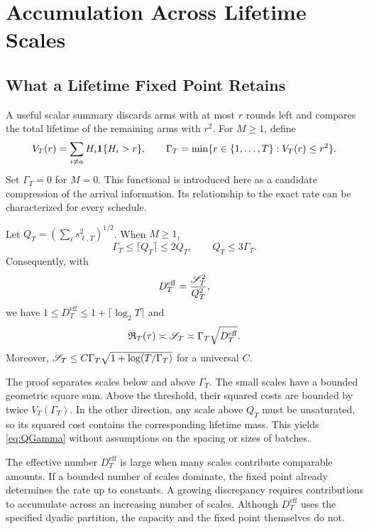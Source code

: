 \section{Accumulation Across Lifetime Scales}\label{sec:scales}
\subsection{What a Lifetime Fixed Point Retains}
A useful scalar summary discards arms with at most $r$ rounds left and compares the total lifetime of the remaining arms with $r^2$. For $M\ge1$, define
\begin{equation}\label{eq:fixed-point}
 V_T(r)=\sum_{i\ne a}H_i\mathbf 1\{H_i>r\},\qquad
 \Gamma_T=\min\{r\in\{1,\ldots,T\}:V_T(r)\le r^2\}.
\end{equation}
Set $\Gamma_T=0$ for $M=0$. This functional is introduced here as a candidate compression of the arrival information. Its relationship to the exact rate can be characterized for every schedule.

\begin{theorem}\label{thm:fixed-point}
Let $Q_T=(\sum_\ell s_{\ell,T}^2)^{1/2}$. When $M\ge1$,
\begin{equation}\label{eq:QGamma}
 \Gamma_T\le\lceil Q_T\rceil\le2Q_T,
 \qquad Q_T\le3\Gamma_T.
\end{equation}
Consequently, with
\begin{equation}\label{eq:effective}
 D_T^{\mathrm{eff}}=\frac{\mathscr S_T^2}{Q_T^2},
\end{equation}
we have $1\le D_T^{\mathrm{eff}}\le1+\lceil\log_2T\rceil$ and
\[
 \mathfrak R_T(\tau)\asymp\mathscr S_T\asymp\Gamma_T\sqrt{D_T^{\mathrm{eff}}}.
\]
Moreover, $\mathscr S_T\le C\Gamma_T\sqrt{1+\log(T/\Gamma_T)}$ for a universal $C$.
\end{theorem}

The proof separates scales below and above $\Gamma_T$. The small scales have a bounded geometric square sum. Above the threshold, their squared costs are bounded by twice $V_T(\Gamma_T)$. In the other direction, any scale above $Q_T$ must be unsaturated, so its squared cost contains the corresponding lifetime mass. This yields \eqref{eq:QGamma} without assumptions on the spacing or sizes of batches.

The effective number $D_T^{\mathrm{eff}}$ is large when many scales contribute comparable amounts. If a bounded number of scales dominate, the fixed point already determines the rate up to constants. A growing discrepancy requires contributions to accumulate across an increasing number of scales. Although $D_T^{\mathrm{eff}}$ uses the specified dyadic partition, the capacity and the fixed point themselves do not.

